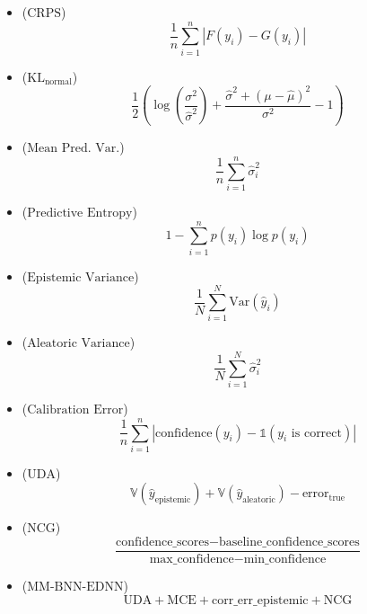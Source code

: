 \begin{formelsammlung}
  \begin{mdframed}[style=exercise]
    \begin{itemize}[label={},left=0pt]
      \item {} (\( \text{CRPS} \)) 
      {\scriptsize \[
          \frac{1}{n} \sum_{i=1}^{n} \left| F(y_i) - G(y_i) \right|
      \]} \vspace{-1.5em}
      \item {} (\( \text{KL}_{\text{normal}} \)) 
      {\scriptsize \[
          \frac{1}{2} \left( \log\left(\frac{\sigma^2}{\hat{\sigma}^2}\right) + \frac{\hat{\sigma}^2 + (\mu - \hat{\mu})^2}{\sigma^2} - 1 \right)
      \]} \vspace{-1.5em}
      \item {} (\( \text{Mean Pred. Var.} \)) 
      {\scriptsize \[
          \frac{1}{n} \sum_{i=1}^{n} \hat{\sigma}_i^2
      \]} \vspace{-1.5em}
      \item {} (\( \text{Predictive Entropy} \)) 
      {\scriptsize \[
          1 - \sum_{i=1}^{n} p(y_i) \log p(y_i)
      \]} \vspace{-1.5em}
      \item {} (\( \text{Epistemic Variance} \)) 
      {\scriptsize \[
          \frac{1}{N} \sum_{i=1}^{N} \text{Var}(\hat{y}_i)
      \]} \vspace{-1.5em}
      \item {} (\( \text{Aleatoric Variance} \)) 
      {\scriptsize \[
          \frac{1}{N} \sum_{i=1}^{N} \hat{\sigma}_i^2
      \]} \vspace{-1.5em}
      \item {} (\( \text{Calibration Error} \)) 
      {\scriptsize \[
          \frac{1}{n} \sum_{i=1}^{n} \left| \text{confidence}(y_i) - \mathbb{1}(y_i \text{ is correct}) \right|
      \]} \vspace{-1.5em}
      \item {} (\( \text{UDA} \)) 
      {\scriptsize \[
          \mathbb{V}(\hat{y}_{\text{epistemic}}) + \mathbb{V}(\hat{y}_{\text{aleatoric}}) - \text{error}_{\text{true}}
      \]} \vspace{-1.5em}
      \item {} (\( \text{NCG} \)) 
      {\scriptsize \[
          \frac{\text{confidence\_scores} - \text{baseline\_confidence\_scores}}{\text{max\_confidence} - \text{min\_confidence}}
      \]} \vspace{-1.5em}
      \item {} (\( \text{MM-BNN-EDNN} \)) 
      {\scriptsize \[
          \text{UDA} + \text{MCE} + \text{corr\_err\_epistemic} + \text{NCG}
      \]} \vspace{-1.5em}
    \end{itemize}
  \end{mdframed}

\end{formelsammlung}

\restoregeometry
